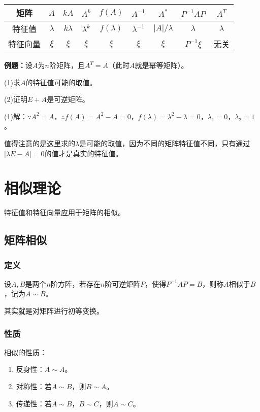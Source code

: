 \documentclass[UTF8, 12pt]{ctexart}
\begin{document}
\begin{tabular}{|c|c|c|c|c|c|c|c|c|}
    \hline
    矩阵 & $A$ & $kA$ & $A^k$ & $f(A)$ & $A^{-1}$ & $A^*$ & $P^{-1}AP$ & $A^T$ \\ \hline
    特征值 & $\lambda$ & $k\lambda$ & $\lambda^k$ & $f(\lambda)$ & $\lambda^{-1}$ & $\vert A\vert/\lambda$ & $\lambda$ & $\lambda$ \\ \hline
    特征向量 & $\xi$ & $\xi$ & $\xi$ & $\xi$ & $\xi$ & $\xi$ & $P^{-1}\xi$ & 无关 \\
    \hline
\end{tabular} \medskip

\textbf{例题：}设$A$为$n$阶矩阵，且$A^T=A$（此时$A$就是幂等矩阵）。

(1)求$A$的特征值可能的取值。

(2)证明$E+A$是可逆矩阵。

(1)解：$\because A^2=A$，$\therefore f(A)=A^2-A=0$，$f(\lambda)=\lambda^2-\lambda=0$，$\lambda_1=0$，$\lambda_2=1$。

值得注意的是这里求的$\lambda$是可能的取值，因为不同的矩阵特征值不同，只有通过$\vert\lambda E-A\vert=0$的值才是真实的特征值。

\section{相似理论}

特征值和特征向量应用于矩阵的相似。

\subsection{矩阵相似}

\subsubsection{定义}

设$A,B$是两个$n$阶方阵，若存在$n$阶可逆矩阵$P$，使得$P^{-1}AP=B$，则称$A$相似于$B$，记为$A\sim B$。

其实就是对矩阵进行初等变换。

\subsubsection{性质}

相似的性质：

\begin{enumerate}
    \item 反身性：$A\sim A$。
    \item 对称性：若$A\sim B$，则$B\sim A$。
    \item 传递性：若$A\sim B$，$B\sim C$，则$A\sim C$。
\end{enumerate}
\end{document}
